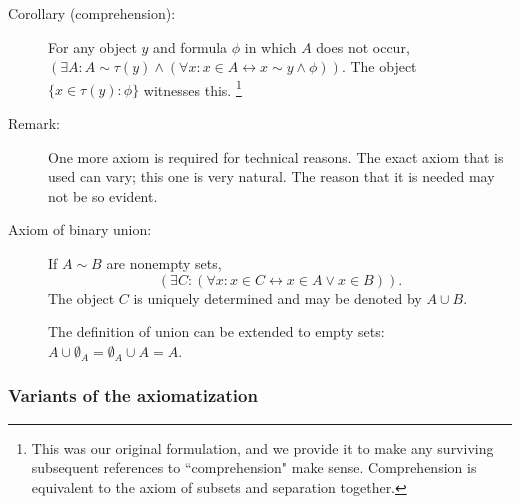 \documentclass[12pt]{article}
\begin{document}
\begin{description}
\item[Corollary (comprehension):]  For any object $y$ and formula $\phi$ in which $A$ does not occur,
$(\exists A:A \sim \tau(y) \wedge (\forall x:x \in A \leftrightarrow x \sim y \wedge \phi))$.  The object $\{x \in \tau(y):\phi\}$ witnesses this.  \footnote{This was our original formulation, and we provide it to make any surviving subsequent references to ``comprehension" make sense.   Comprehension is equivalent to the axiom of subsets and separation together.}

\item[Remark:]  One more axiom is required for technical reasons.  The exact axiom that is used can vary;  this one is very natural.   The reason that it is needed may not be so evident.

\item[Axiom of binary union:]  If $A \sim B$ are nonempty sets, $$(\exists C:(\forall x:x \in C \leftrightarrow x \in A \vee x \in B)).$$  The object $C$ is uniquely determined and may be denoted by $A \cup B$.  

The definition of union can be extended to empty sets:  $A \cup \emptyset_A = \emptyset_A \cup A = A$.

\end{description}

\subsubsection{Variants of the axiomatization}
\end{document}
